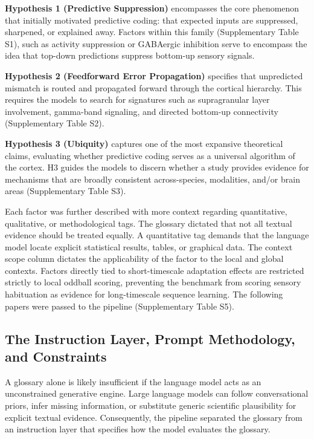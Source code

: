 \documentclass[12pt]{article}
\begin{document}
\textbf{Hypothesis 1 (Predictive Suppression)} encompasses the core phenomenon that initially motivated predictive coding: that expected inputs are suppressed, sharpened, or explained away. Factors within this family (Supplementary Table S1), such as activity suppression or GABAergic inhibition serve to encompass the idea that top-down predictions suppress bottom-up sensory signals\cite{ref6,ref14}.




\textbf{Hypothesis 2 (Feedforward Error Propagation)} specifies that unpredicted mismatch is routed and propagated forward through the cortical hierarchy. This requires the models to search for signatures such as supragranular layer involvement\cite{ref59}, gamma-band signaling\cite{ref14}, and directed bottom-up connectivity\cite{ref24} (Supplementary Table S2).




\textbf{Hypothesis 3 (Ubiquity)} captures one of the most expansive theoretical claims, evaluating whether predictive coding serves as a universal algorithm of the cortex\cite{ref10,ref14}. H3 guides the models to discern whether a study provides evidence for mechanisms that are broadly consistent across-species, modalities, and/or brain areas (Supplementary Table S3).






Each factor was further described with more context regarding quantitative, qualitative, or methodological tags. The glossary dictated that not all textual evidence should be treated equally. A quantitative tag demands that the language model locate explicit statistical results, tables, or graphical data. The context scope column dictates the applicability of the factor to the local and global contexts. Factors directly tied to short-timescale adaptation effects are restricted strictly to local oddball scoring, preventing the benchmark from scoring sensory habituation as evidence for long-timescale sequence learning. The following papers were passed to the pipeline (Supplementary Table S5).




\subsection{The Instruction Layer, Prompt Methodology, and Constraints}\label{the-instruction-layer-prompt-methodology-and-constraints}

A glossary alone is likely insufficient if the language model acts as an unconstrained generative engine\cite{ref58}. Large language models can follow conversational priors, infer missing information, or substitute generic scientific plausibility for explicit textual evidence\cite{ref82}. Consequently, the pipeline separated the glossary from an instruction layer that specifies how the model evaluates the glossary.
\end{document}
